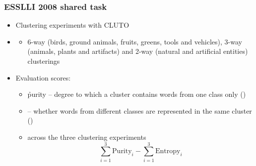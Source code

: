 \documentclass[t]{beamer} %
\begin{document}
\begin{frame}
  \frametitle{ESSLLI 2008 shared task}
  \begin{itemize}
  \item Clustering experiments with CLUTO \citep{Karypis:03}
  \item[]
    \begin{itemize}
    \item 6-way (birds, ground animals, fruits, greens,
      tools and vehicles), 3-way (animals, plants and
      artifacts) and 2-way (natural and artificial entities) clusterings
    \end{itemize}
    \pause
  \item Evaluation scores:
    \begin{itemize}
    \item \h{purity} -- degree to which a cluster contains words from one class only ()
    \item {} -- whether words from different classes are represented in the same cluster ()
    \item {} across the three clustering experiments
      \begin{displaymath}
        \sum_{i=1}^3 \text{Purity}_i -  \sum_{i=1}^3 \text{Entropy}_i
      \end{displaymath}
    \end{itemize}
  \end{itemize}
\end{frame}
\end{document}
